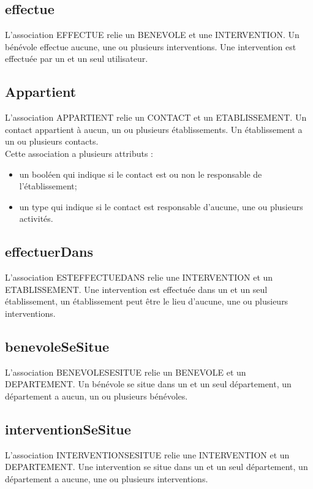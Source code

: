 \documentclass[asi, sansVersion]{picInsa}
\begin{document}
\subsection*{effectue} 

L'association EFFECTUE relie un BENEVOLE et une INTERVENTION. Un bénévole effectue aucune, une ou plusieurs interventions. Une intervention est effectuée par un et un seul utilisateur. 

\subsection*{Appartient}

L'association APPARTIENT relie un CONTACT et un ETABLISSEMENT. Un contact appartient à aucun, un ou plusieurs établissements. Un établissement a un ou plusieurs contacts.\\
Cette association a plusieurs attributs :
\begin{itemize}
\item un booléen qui indique si le contact est ou non le responsable de l'établissement; 
\item un type qui indique si le contact est responsable d'aucune, une ou plusieurs activités.
\end{itemize}

\subsection*{effectuerDans}

L'association ESTEFFECTUEDANS relie une INTERVENTION et un ETABLISSEMENT. Une intervention est effectuée dans un et un seul établissement, un établissement peut être le lieu d'aucune, une ou plusieurs interventions.

\subsection*{benevoleSeSitue}

L'association BENEVOLESESITUE relie un BENEVOLE et un DEPARTEMENT. Un bénévole se situe dans un et un seul département, un département a aucun, un ou plusieurs bénévoles.

\subsection*{interventionSeSitue}

L'association INTERVENTIONSESITUE relie une INTERVENTION et un DEPARTEMENT. Une intervention se situe dans un et un seul département, un département a aucune, une ou plusieurs interventions.
\end{document}
